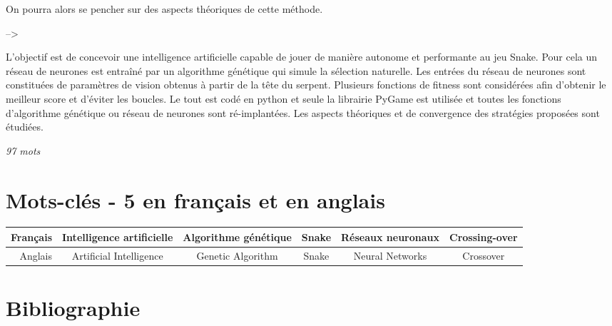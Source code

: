 \documentclass[11pt,a4paper]{article}
\begin{document}
On pourra alors se pencher sur des aspects théoriques de cette méthode.

-->

L'objectif est de concevoir une intelligence artificielle capable de jouer de manière autonome et performante au jeu Snake.
Pour cela un réseau de neurones est entraîné par un algorithme génétique qui simule la sélection naturelle.
Les entrées du réseau de neurones sont constituées de paramètres de vision obtenus à partir de la tête du serpent.
Plusieurs fonctions de fitness sont considérées afin d'obtenir le meilleur score et d'éviter les boucles.
Le tout est codé en python et seule la librairie PyGame est utilisée et toutes les fonctions d'algorithme génétique ou réseau de neurones sont ré-implantées.
Les aspects théoriques et de convergence des stratégies proposées sont étudiées.

\textit{97 mots}

\section{Mots-clés - 5 en français et en anglais}

\footnotesize
\begin{tabular}{||r|c|c|c|c|c||} \hline
	Français & Intelligence artificielle & Algorithme génétique & Snake & Réseaux neuronaux & Crossing-over \\ \hline \hline
	Anglais & Artificial Intelligence & Genetic Algorithm & Snake & Neural Networks & Crossover \\
		\hline
	\end{tabular}

\section{Bibliographie}




\end{document}
